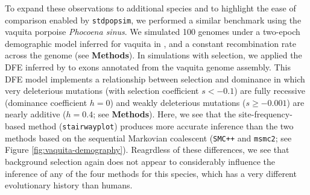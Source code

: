 \documentclass[hidelinks]{article}
\newcommand{\stdpopsim}{\texttt{stdpopsim}\xspace}
\newcommand{\msmc}{\texttt{msmc2}\xspace}
\newcommand{\stairway}{\texttt{stairwayplot}\xspace}
\newcommand{\gone}{\texttt{GONE}\xspace}
\newcommand{\smcpp}{\texttt{SMC++}\xspace}
\begin{document}
    To expand these observations to additional species and to highlight the ease of comparison enabled by \stdpopsim,
    we performed a similar benchmark using the vaquita porpoise \textit{Phocoena sinus}.
    We simulated 100 genomes under a two-epoch demographic model inferred for vaquita in \textcite{robinson2022critically},
    and a constant recombination rate across the genome (see \textbf{Methods}).
    In simulations with selection, we applied the DFE inferred by \textcite{robinson2022critically} to exons
    annotated from the vaquita genome assembly.
    This DFE model implements a relationship between selection and dominance 
    in which very deleterious mutations (with selection coefficient $s<-0.1$) are fully recessive
    (dominance coefficient $h=0$) and weakly deleterious mutations ($s\geq -0.001$) are nearly
    additive ($h=0.4$; see \textbf{Methods}).
    Here, we see that the site-frequency-based method (\stairway) produces more accurate
    inference than the two methods based on the sequential Markovian coalescent (\smcpp and \msmc; see Figure \ref{fig:vaquita-demography}).
    Reagrdless of these differences, we see that background selection again does not
    appear to considerably influence the inference of any of the four methods for this species,
    which has a very different evolutionary history than humans.
    
    


%
\end{document}
